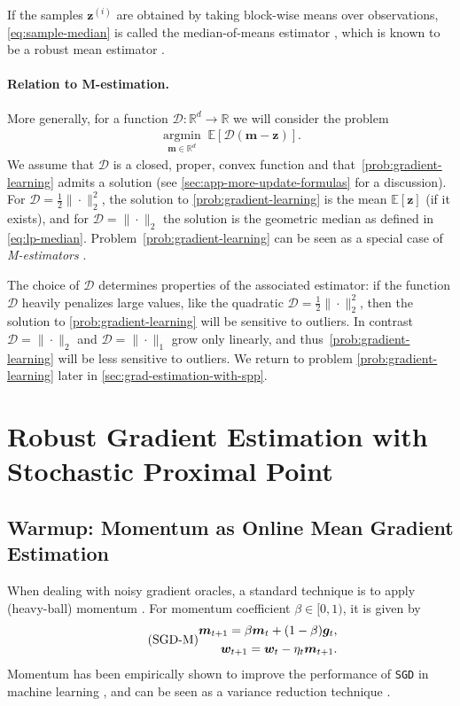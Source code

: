 \documentclass[10pt]{article} %
\renewcommand{\vec}[1]{\bm{#1}}
\DeclareMathOperator{\argmininn}{argmin}
\newcommand{\argmin}[1]{ \underset{#1}{\argmininn} \;}
\newcommand{\R}{\mathbb{R}}
\newcommand{\E}[1]{\mathbb{E}\left[#1\right] }
\newcommand{\norm}[1]{ \|#1 \|}
\newcommand{\dist}{\mathcal{D}}
\newcommand{\SGD}{\texttt{SGD}}
\begin{document}
If the samples $\vec{z}^{(i)}$ are obtained by taking block-wise means over observations, \eqref{eq:sample-median} is called the median-of-means estimator \citep{Nemirovsky1983,Lugosi2019}, which is known to be a robust mean estimator \citep{Lugosi2019}. 


\paragraph{Relation to M-estimation.} More generally, for a function $\dist: \R^d \to \R$ we will consider the problem
\begin{align}\label{prob:gradient-learning}
   \argmin{\vec{m} \in \R^d} \E{ \dist(\vec{m}-\vec{z})}.
\end{align}
We assume that  $\dist$ is a closed,  proper, convex function and that~\eqref{prob:gradient-learning} admits a solution (see \cref{sec:app-more-update-formulas} for a discussion).
For $\dist = \tfrac12\norm{\cdot}_2^2$, the solution to \eqref{prob:gradient-learning} is the mean $\E{\vec{z}}$ (if it exists), and for $\dist=\|\cdot\|_2$ the solution is the geometric median as defined in \eqref{eq:lp-median}. 
Problem~\eqref{prob:gradient-learning}  can be seen as a special case of \emph{M-estimators} \citep[Sec.\ 3.2]{Huber1981}.

The choice of $\dist$ determines properties of the associated estimator:
if the function $\dist$ heavily penalizes large values, like the quadratic  $\dist = \tfrac12\norm{\cdot}_2^2$, then the solution to \eqref{prob:gradient-learning} will be sensitive to outliers. In contrast  $\dist  = \norm{\cdot}_2$ and $\dist  = \norm{\cdot}_1$ grow only linearly, and thus~\eqref{prob:gradient-learning} will be less sensitive to outliers. We return to problem \eqref{prob:gradient-learning} later in \cref{sec:grad-estimation-with-spp}.

\section{Robust Gradient Estimation with Stochastic Proximal Point}
\subsection{Warmup: Momentum as Online Mean Gradient Estimation}\label{sec:momentum-mean-estimation}

When dealing with noisy gradient oracles, a standard technique is to apply (heavy-ball) momentum \citep{Polyak1964}. For momentum coefficient $\beta\in [0,1)$, it is given by
\begin{align}\label{eqn:momentum}\tag{\texttt{SGD-M}}
    \begin{split}
        \vec{m}_{t+1} =  \beta \vec{m}_t + (1-\beta) \vec{g}_t, \\
    \vec{w}_{t+1} = \vec{w}_t - \eta_t \vec{m}_{t+1}.
    \end{split}
\end{align}
Momentum has been empirically shown to improve the performance of \SGD{} in machine learning \citep{sutskever13}, and can be seen as a variance reduction technique \citep{Gower2020}.
\end{document}
